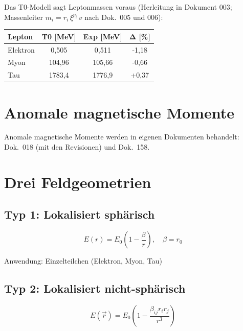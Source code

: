 	Das T0-Modell sagt Leptonmassen voraus (Herleitung in Dokument 003; Massenleiter $m_i = r_i\,\xi^{p_i}\,v$ nach Dok.~005 und 006):
	
	\begin{table}[h]
		\centering
		\begin{tabular}{lccc}
			\hline
			\textbf{Lepton} & \textbf{T0 [MeV]} & \textbf{Exp [MeV]} & \textbf{Δ [\%]} \\
			\hline
			Elektron & 0,505 & 0,511 & -1,18 \\
			Myon & 104,96 & 105,66 & -0,66 \\
			Tau & 1783,4 & 1776,9 & +0,37 \\
			\hline
		\end{tabular}
	\end{table}
	
	\section{Anomale magnetische Momente}
	\label{sec:g2}

	Anomale magnetische Momente werden in eigenen Dokumenten behandelt: Dok.~018 (mit den Revisionen) und Dok.~158.

	\section{Drei Feldgeometrien}
	\label{sec:field_geometries}
	
	\subsection{Typ 1: Lokalisiert sphärisch}
	
	\begin{equation}
		E(r) = E_0 \left(1 - \frac{\beta}{r}\right), \quad \beta = r_0
	\end{equation}
	
	Anwendung: Einzelteilchen (Elektron, Myon, Tau)
	
	\subsection{Typ 2: Lokalisiert nicht-sphärisch}
	
	\begin{equation}
		E(\vec{r}) = E_0 \left(1 - \frac{\beta_{ij} r_i r_j}{r^3}\right)
	\end{equation}
	
